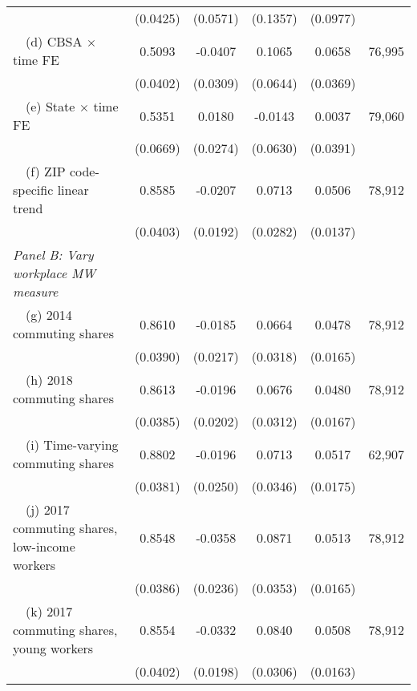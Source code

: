 \begin{landscape}
\begin{table}[ht!]
\begin{tabular}{@{}lccccc@{}}
                                                             & (0.0425) & (0.0571) & (0.1357) & (0.0977) &      \\
        $\quad$(d) CBSA $\times$ time FE                     &  0.5093  &  -0.0407  &  0.1065  &  0.0658  & 76,995 \\
                                                             & (0.0402) & (0.0309) & (0.0644) & (0.0369) &      \\
        $\quad$(e) State $\times$ time FE                    &  0.5351  &  0.0180  &  -0.0143  &  0.0037  & 79,060 \\
                                                             & (0.0669) & (0.0274) & (0.0630) & (0.0391) &      \\
        $\quad$(f) ZIP code-specific linear trend            &  0.8585  &  -0.0207  &  0.0713  &  0.0506  & 78,912 \\
                                                             & (0.0403) & (0.0192) & (0.0282) & (0.0137) &      \\
        \textit{Panel B: Vary workplace MW measure}          &       &       &       &       &      \\
        $\quad$(g) 2014 commuting shares                     &  0.8610  &  -0.0185  &  0.0664  &  0.0478  & 78,912 \\
                                                             & (0.0390) & (0.0217) & (0.0318) & (0.0165) &      \\
        $\quad$(h) 2018 commuting shares                     &  0.8613  &  -0.0196  &  0.0676  &  0.0480  & 78,912 \\
                                                             & (0.0385) & (0.0202) & (0.0312) & (0.0167) &      \\
        $\quad$(i) Time-varying commuting shares             &  0.8802  &  -0.0196  &  0.0713  &  0.0517  & 62,907 \\
                                                             & (0.0381) & (0.0250) & (0.0346) & (0.0175) &      \\
        $\quad$(j) 2017 commuting shares, low-income workers &  0.8548  &  -0.0358  &  0.0871  &  0.0513  & 78,912 \\
                                                             & (0.0386) & (0.0236) & (0.0353) & (0.0165) &      \\
        $\quad$(k) 2017 commuting shares, young workers      &  0.8554  &  -0.0332  &  0.0840  &  0.0508  & 78,912 \\
                                                             & (0.0402) & (0.0198) & (0.0306) & (0.0163) &      \\ \bottomrule
    \end{tabular}


\end{table}
\end{landscape}
